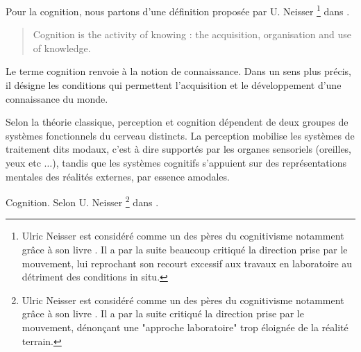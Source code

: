
Pour la cognition, nous partons d'une définition proposée par U. Neisser \footnote{Ulric Neisser est considéré comme un des pères du cognitivisme notamment grâce à son livre \citep{neisser1967cognitive}. Il a par la suite beaucoup critiqué la direction prise par le mouvement, lui reprochant son recourt excessif aux travaux en laboratoire au détriment des conditions in situ.} dans \citep[p. ??]{neisser1976cognition}. 

\begin{quote}
Cognition is the activity of knowing : the acquisition, organisation and use of knowledge.
\end{quote}

Le terme cognition renvoie à la notion de connaissance. Dans un sens plus précis, il désigne les conditions qui permettent l'acquisition et le développement d'une connaissance du monde.

Selon la théorie classique, perception et cognition dépendent de deux groupes de systèmes fonctionnels du cerveau distincts. La perception mobilise les systèmes de traitement dits modaux, c'est à dire supportés par les organes sensoriels (oreilles, yeux etc $\ldots$), tandis que les systèmes cognitifs s'appuient sur des représentations mentales des réalités externes, par essence amodales.

Cognition. 
Selon U. Neisser \footnote{Ulric Neisser est considéré comme un des pères du cognitivisme notamment grâce à son livre \citep{neisser1967cognitive}. Il a par la suite critiqué la direction prise par le mouvement, dénonçant une "approche laboratoire" trop éloignée de la réalité terrain.} dans \citep[p. ??]{neisser1976cognition}.

